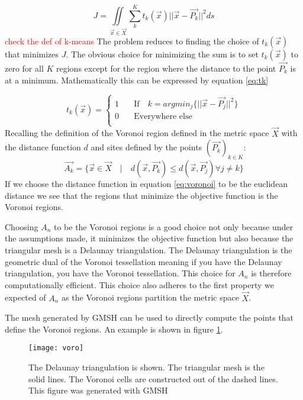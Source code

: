 \begin{equation}
    J = \iint \limits_{\Vec{x}\in\Vec{X}}\sum_{k}^{K}t_k(\Vec{x})||\Vec{x}- \Vec{P_k}||^2ds
    \label{eq:objFunc}
\end{equation}
\textcolor{red}{check the def of k-means}
The problem reduces to finding the choice of $t_k(\Vec{x})$ that minimizes $J$. The obvious choice for minimizing the sum is to set $t_k(\Vec{x})$ to zero for all $K$ regions except for the region where the distance to the point $\Vec{P_k}$ is at a minimum. Mathematically this can be expressed by equation \ref{eq:tk}

\begin{equation}
    t_k(\Vec{x}) = 
    \begin{cases}
        1 & \quad \text{If} \quad k = argmin_j\{||\Vec{x} - \Vec{P_j}||^2\}  \\
        0 & \quad \text{Everywhere else} \\
    \end{cases}
    \label{eq:tk}
\end{equation}
Recalling the definition of the Voronoi region defined in the metric space $\Vec{X}$ with the distance function $d$ and sites defined by the points $(\Vec{P_k})_{k \in K} $: 
\begin{equation}
    \Vec{A_k} = \{\Vec{x} \in \Vec{X} \quad | \quad d(\Vec{x},\Vec{P_k}) \leq d(\Vec{x},\Vec{P_j})\forall  j \neq k \}
    \label{eq:voronoi}
\end{equation}
If we choose the distance function in equation \ref{eq:voronoi} to be the euclidean distance we see that the regions that minimize the objective function is the Voronoi regions. \par
Choosing $A_n$ to be the Voronoi regions is a good choice not only because under the assumptions made, it minimizes the objective function but also because the triangular mesh is a Delaunay triangulation. The Delaunay triangulation is the geometric dual of the Voronoi tessellation meaning if you have the Delaunay triangulation, you have the Voronoi tessellation. This choice for $A_n$ is therefore computationally efficient. This choice also adheres to the first property we expected of $A_n$ as the Voronoi regions partition the metric space $\Vec{X}$. \par
The mesh generated by GMSH can be used to directly compute the points that define the Voronoi regions. An example is shown in figure \ref{fig:voronoi}. 

\begin{figure}[h]
    \centering
    \texttt{[image: voro]}
    \caption{The Delaunay triangulation is shown. The triangular mesh is the solid lines. The Voronoi cells are constructed out of the dashed lines. This figure was generated with GMSH \cite{GMSH}}
    \label{fig:voronoi}
\end{figure}

